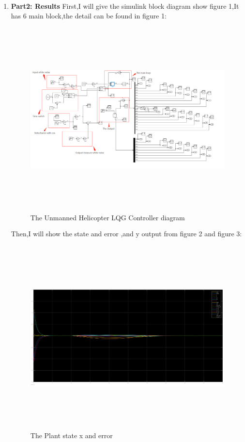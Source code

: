 \documentclass[12pt, a4paper]{article}
\begin{document}
\begin{enumerate}[1.]
\item \textbf{ Part2: Results}
First,I will give the simulink block diagram show figure 1,It has 6 main block,the detail can be found in figure 1:\\
\begin{figure}[H]
    \centering
    \includegraphics[width=20cm,height=10cm,scale=0.6]{block_diagram.png}
    \caption{The Unmanned Helicopter LQG Controller diagram}
    \label{fig:label}
    \end{figure}

Then,I will show the state and error ,and y output from figure 2 and figure 3:\\
\begin{figure}[H]
    \centering
    \includegraphics[width=20cm,height=10cm,scale=0.6]{state_18.png}
    \caption{The Plant state x and error}
    \label{fig:label}
    \end{figure}


\end{enumerate}
\end{document}
